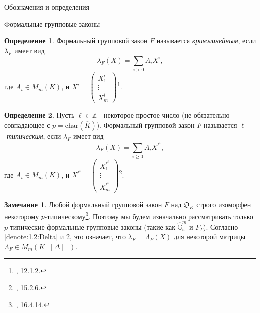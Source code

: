 \documentclass[a4paper,14pt]{extarticle}
\theoremstyle{definition}
\newtheorem{definition}{Определение}[section]
\newtheorem{remark}{Замечание}[section]
\newcommand{\fchar}[1]{\mathrm{char}\left(#1\right)}
\newcommand{\bG}{\mathbb{G}}
\newcommand{\bZ}{\mathbb{Z}}
\newcommand{\fO}{\mathfrak{O}}
\newcommand{\GGa}{\hat{\bG}_{\mathrm{a}}}
\begin{document}
\begin{section}{Обозначения и определения}
\begin{subsection}{Формальные групповые законы}
\begin{definition}\label{def:2.3:curvilinear}
    Формальный групповой закон $F$ называется \textit{криволинейным}, если $\lambda_F$ имеет вид
    \begin{equation*}
        \lambda_F(X) =
        \sum_{i > 0}
        A_i X^i,
    \end{equation*}
    где ${ A_i \in M_m(K) }$, и ${ X^i = \left( \begin{matrix} X_1^i \\ \vdots \\ X_m^i \end{matrix} \right) }$\footnote{
        \cite{Hazewinkel}, 12.1.2.
    }.
\end{definition}

\begin{definition}\label{def:2.4:p-typical}
    Пусть ${ \ell \in \bZ }$ - некоторое простое число (не обязательно совпадающее с ${ p = \fchar{\overline{K}} }$). Формальный групповой закон $F$ называется \textit{$\ell$-типическим}, если $\lambda_F$ имеет вид
    \begin{equation*}
        \lambda_F(X) =
        \sum_{i \geq 0} A_i X^{\ell^i},
    \end{equation*}
    где ${ A_i \in M_m(K) }$, и ${ X^{\ell^i} = \left( \begin{matrix} X_1^{\ell^i} \\ \vdots \\ X_m^{\ell^i} \end{matrix} \right) }$\footnote{
        \cite{Hazewinkel}, 15.2.6.
    }.
\end{definition}

\begin{remark}\label{remark:2.after_p-typical:F_is_p-typical}
    Любой формальный групповой закон $F$ над $\fO_K$ строго изоморфен некоторому $p$-типическому\footnote{
        \cite{Hazewinkel}, 16.4.14.
    }. Поэтому мы будем изначально рассматривать только $p$-типические формальные групповые законы (такие как $\GGa^m$ и $F_\Gamma$). Согласно \ref{denote:1.2:Delta} и \ref{def:2.4:p-typical}, это означает, что ${ \lambda_F = \Lambda_F(X) }$ для некоторой матрицы ${ \Lambda_F \in M_m(K[[\Delta]]) }$.
\end{remark}


\end{subsection}
\end{section}
\end{document}
